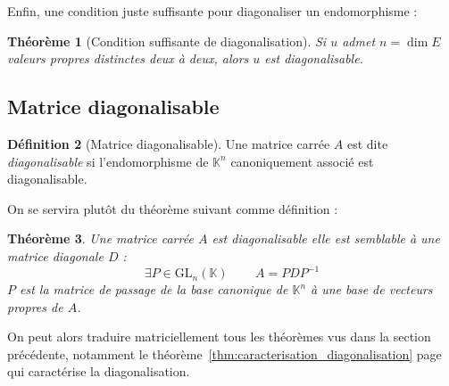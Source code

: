 \documentclass[11pt,a4paper]{report}
\newtheorem{theorem}{Théorème}[chapter]
\newtheorem{itheorem}[theorem]{Théorème}
\theoremstyle{definition}
\newtheorem{dfn}[theorem]{Définition}
\begin{document}
Enfin, une condition juste suffisante pour diagonaliser un endomorphisme : 
\begin{theorem}[Condition suffisante de diagonalisation]
     Si $u$ admet $n = \dim E$ valeurs propres distinctes deux à deux, alors $u$ est diagonalisable.
\end{theorem}
%
\subsection{Matrice diagonalisable}
\begin{dfn}[Matrice diagonalisable]
     Une matrice carrée $A$ est dite \emph{diagonalisable} si l'endomorphisme de $\mathbb{K}^n$ canoniquement associé est diagonalisable.
\end{dfn}
On se servira plutôt du théorème suivant comme définition :
\begin{itheorem}
      Une matrice carrée $A$ est diagonalisable \Longleftrightarrow elle est semblable à une matrice diagonale $D$ : 
     \begin{equation}
      \exists P\in \mathrm{GL}_n(\mathbb{K})\, \qquad A = PDP^{-1}
      \end{equation} 
      $P$ est la matrice de passage de la base canonique de $\mathbb{K}^n$ à une base de vecteurs propres de $A$.
\end{itheorem}
On peut alors traduire matriciellement tous les théorèmes vus dans la section précédente, notamment le théorème~\ref{thm:caracterisation_diagonalisation} page~\pageref{thm:caracterisation_diagonalisation} qui caractérise la diagonalisation.

\end{document}
